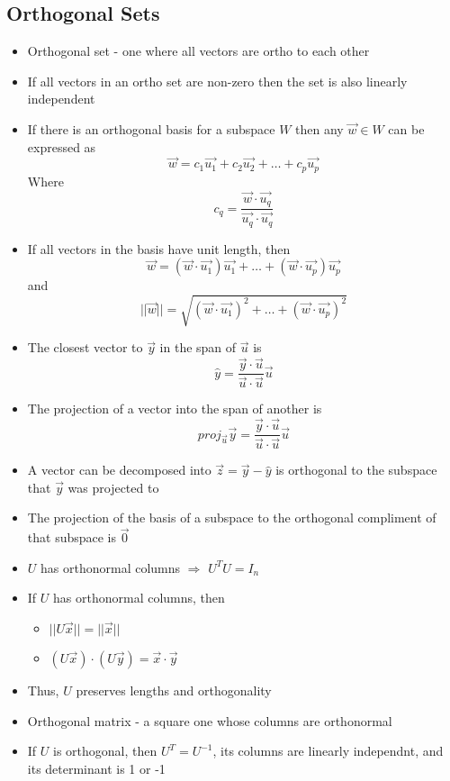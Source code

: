 \documentclass{article}
\begin{document}
\subsection{Orthogonal Sets}
\begin{itemize}
    \item Orthogonal set - one where all vectors are ortho to each other 
    \item If all vectors in an ortho set are non-zero then the set is also linearly independent 
    \item If there is an orthogonal basis for a subspace \(W\) then any \(\vec{w}\in W\) can be expressed as 
    \[\vec{w}=c_1\vec{u_1}+c_2\vec{u_2}+\dots+c_p\vec{u_p}\] Where \[c_q=\frac{\vec{w}\cdot\vec{u_q}}{\vec{u_q}\cdot\vec{u_q}}\]
    \item If all vectors in the basis have unit length, then \[\vec{w}=(\vec{w}\cdot\vec{u_1})\vec{u_1}+\dots+(\vec{w}\cdot\vec{u_p})\vec{u_p}\] and 
    \[||\vec{w}||=\sqrt{(\vec{w}\cdot\vec{u_1})^2+\dots+(\vec{w}\cdot\vec{u_p})^2}\]
    \item The closest vector to \(\vec{y}\) in the span of \(\vec{u}\) is \[\hat{y}=\frac{\vec{y}\cdot\vec{u}}{\vec{u}\cdot\vec{u}}\vec{u}\]
    \item The projection of a vector into the span of another is \[proj_{\vec{u}}\vec{y}=\frac{\vec{y}\cdot\vec{u}}{\vec{u}\cdot\vec{u}}\vec{u}\]
    \item A vector can be decomposed into \(\vec{z}=\vec{y}-\hat{y}\) is orthogonal to the subspace that \(\vec{y}\) was projected to
    \item The projection of the basis of a subspace to the orthogonal compliment of that subspace is \(\vec{0}\) 
    \item \(U\) has orthonormal columns \(\Rightarrow\) \(U^TU=I_n\)
    \item If \(U\) has orthonormal columns, then 
    \begin{itemize}
        \item \(||U\vec{x}||=||\vec{x}||\)
        \item \((U\vec{x})\cdot(U\vec{y})=\vec{x}\cdot\vec{y}\)
    \end{itemize}
    \item Thus, \(U\) preserves lengths and orthogonality 
    \item Orthogonal matrix - a square one whose columns are orthonormal 
    \item If \(U\) is orthogonal, then \(U^T=U^{-1}\), its columns are linearly independnt, and its determinant is 1 or -1
\end{itemize}
\end{document}
